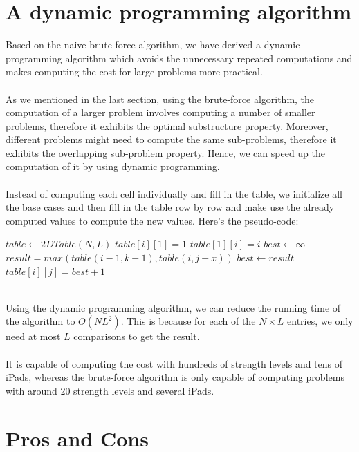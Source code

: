\documentclass[12pt,a4paper,oneside]{report}
\begin{document}
\section{A dynamic programming algorithm}
Based on the naive brute-force algorithm, we have derived a dynamic programming algorithm which avoids the unnecessary repeated computations and makes computing the cost for large problems more practical. \\\\
As we mentioned in the last section, using the brute-force algorithm, the computation of a larger problem involves computing a number of smaller problems, therefore it exhibits the optimal substructure property. Moreover, different problems might need to compute the same sub-problems, therefore it exhibits the overlapping sub-problem property. Hence, we can speed up the computation of it by using dynamic programming. \\\\
Instead of computing each cell individually and fill in the table, we initialize all the base cases and then fill in the table row by row and make use the already computed values to compute the new values. Here's the pseudo-code:
\begin{algorithm}
\caption{$makeTable(N, L)$}
\begin{algorithmic}[1]
\STATE $table \leftarrow 2DTable(N, L)$
	\STATE $table[i][1] = 1$
\ENDFOR
{}
	\STATE $table[1][i] = i$
\ENDFOR
{}
		\STATE $best \leftarrow \infty$
			\STATE $result = max(table(i - 1, k - 1), table(i, j - x))$
				\STATE $best \leftarrow result$
			\ENDIF
		\ENDFOR
		\STATE $table[i][j] = best + 1$
	\ENDFOR
\ENDFOR
\end{algorithmic}
\end{algorithm}
~\\
Using the dynamic programming algorithm, we can reduce the running time of the algorithm to $O(NL^2)$. This is because for each of the $N \times L$ entries, we only need at most $L$ comparisons to get the result. \\\\
It is capable of computing the cost with hundreds of strength levels and tens of iPads, whereas the brute-force algorithm is only capable of computing problems with around 20 strength levels and several iPads.
\section{Pros and Cons}
\end{document}
